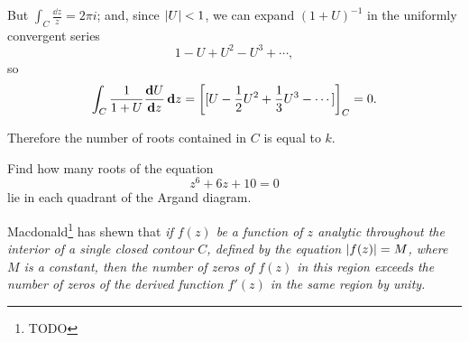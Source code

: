 But $\int_{C} \frac{\dd z}{z} = 2 \pi i$; and, since $\left| U \right| < 1$,
we can expand $(1 + U)^{-1}$ in the uniformly convergent series
$$
1 - U + U^{2} - U^{3} + \cdots,
$$
so
$$
\int_{C} \frac{1}{1+U} \frac{\mathbf{d} U}{\mathbf{d} z} \, \mathbf{d} z
=
\left[ 
  [U - \frac{1}{2} U^{2} + \frac{1}{3} U^{3} - \cdots]
 \right]_{C}
=
0.
$$

Therefore the number of roots contained in $C$ is equal to $k$.
\begin{wandwexample}
Find how many roots of the equation
$$
z^{6} + 6z + 10 = 0
$$
lie in each quadrant of the Argand diagram.
\end{wandwexample}
%
%

Macdonald\footnote{TODO} has shewn that \emph{if $f(z)$ be a function of $z$
analytic throughout the interior of a single closed contour $C$, defined
by the equation $\left| f(z) \right| = M$, where $M$ is a constant, then the
number of zeros of $f(z)$ in this region exceeds the number of zeros of
the derived function $f'(z)$ in the same region by unity.}

